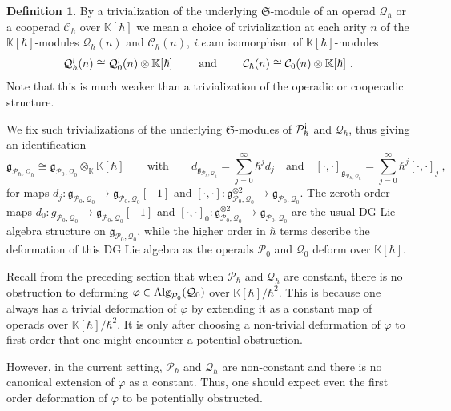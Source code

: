 \documentclass[11pt]{amsart}
\numberwithin{equation}{section}
\theoremstyle{definition}
\newtheorem{defn}[theo]{Definition}
\newcommand{\bb}{\mathbb}
\newcommand{\mc}{\mathcal}
\newcommand{\mf}{\mathfrak}
\newcommand{\gPQh}{{\mathfrak{g}_{\mc P_\hbar,\mc Q_\hbar}}}
\newcommand{\N}{{\mathbb{N}}}
\newcommand{\K}{{\bb K}}
\newcommand{\ik}{{\bb K}}
\newcommand{\Alg}{{\textup{Alg}}}
\newcommand{\ash}{{\textup{\mbox{!`}}}}
\newcommand{\Ss}{{{\mf{S}}}}
\newcommand{\CC}{{\textup{CC}}}
\newcommand{\0}{{\textbf{0}}}
\newcommand{\gr}{\textup{gr}}
\newcommand{\g}{{\mf{g}}}
\def\CC{{\mc C}}
\def\PP{{\mc P}}
\def\QQ{{\mc Q}}
\def \mf{\mathfrak}
\def \ie{{\it i.e.}}
\begin{document}
\begin{defn}\label{Ssmodtrivdefn} 
By a trivialization of the underlying $\Ss$-module of an operad $\QQ_\hbar$ or a cooperad $\CC_\hbar$ over $\ik[\hbar]$ we mean a choice of trivialization at each arity $n$ of the $\ik[\hbar]$-modules $\QQ_\hbar(n)$ and $\CC_\hbar(n)$, \ie am isomorphism of $\ik[\hbar]$-modules
\[
\QQ_{\hbar}^\ash(n) \cong \QQ_0^\ash(n) \otimes \ik[\hbar] \qquad \text{ and } \qquad \CC_\hbar(n) \cong \CC_0(n) \otimes \ik[\hbar]~.
\]
Note that this is much weaker than a trivialization of the operadic or cooperadic structure.
\end{defn}

We fix such trivializations of the underlying $\Ss$-modules of $\mc P^\ash_\hbar$ and $\mc Q_\hbar$, thus giving an identification
\begin{equation}\label{gtriveqn}
	 \gPQh \cong \g_{\mc P_0,\mc Q_0}\otimes_{\K} \K[\hbar] \qquad\text{with}\qquad d_{\gPQh}= \sum_{j=0}^\infty \hbar^j d_j \quad \text{and} \quad [\cdot ,\cdot]_\gPQh = \sum_{j=0}^\infty \hbar^j[\cdot,\cdot]_j \ ,
\end{equation}
for maps $d_j:\g_{\mc P_0,\mc Q_0} \to \g_{\mc P_0,\mc Q_0}[-1]$ and $[\cdot,\cdot] :\g_{\mc P_0,\mc Q_0}^{\otimes 2}\to \g_{\mc P_0,\mc Q_0}$. The zeroth order maps $d_0:g_{\mc P_0,\mc Q_0} \to \g_{\mc P_0,\mc Q_0}[-1]$ and $[\cdot,\cdot]_0 :\g_{\mc P_0,\mc Q_0}^{\otimes 2}\to \g_{\mc P_0,\mc Q_0}$ are the usual DG Lie algebra structure on $\g_{\mc P_0,\mc Q_0}$, while the higher order in $\hbar$ terms describe the deformation of this DG Lie algebra as the operads $\mc P_0$ and $\mc Q_0$ deform over $\K[\hbar]$.


Recall from the preceding section that when $\PP_\hbar$ and $\QQ_\hbar$ are constant, there is no obstruction to deforming $\varphi\in\Alg_{\PP_0}(\QQ_0)$ over $\ik[\hbar]/\hbar^2$. This is because one always has a trivial deformation of $\varphi$ by extending it as a constant map of operads over $\ik[\hbar]/\hbar^2$. It is only after choosing a non-trivial deformation of $\varphi$ to first order that one might encounter a potential obstruction.

However, in the current setting, $\PP_\hbar$ and $\QQ_\hbar$ are non-constant and there is no canonical extension of $\varphi$ as a constant. Thus, one should expect even the first order deformation of $\varphi$ to be potentially obstructed. 
\end{document}
